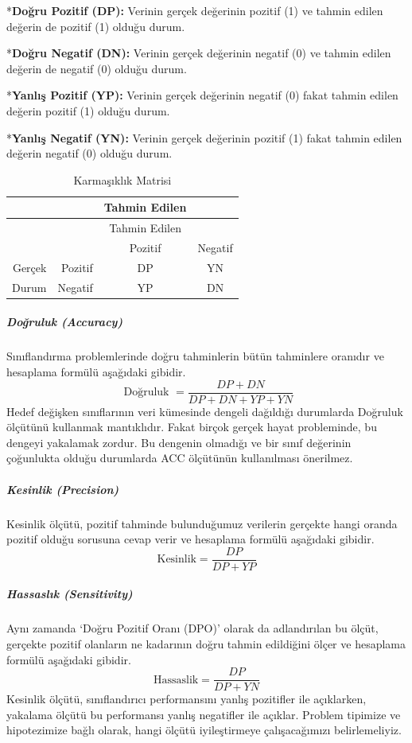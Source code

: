\documentclass[12pt,twoside]{deuthesis}
\begin{document}
*\textbf{Doğru Pozitif (DP):} Verinin gerçek değerinin pozitif (1) ve tahmin edilen değerin de pozitif (1) olduğu durum.

*\textbf{Doğru Negatif (DN):} Verinin gerçek değerinin negatif (0) ve tahmin edilen değerin de negatif (0) olduğu durum.

*\textbf{Yanlış Pozitif (YP):} Verinin gerçek değerinin negatif (0) fakat tahmin edilen değerin pozitif (1) olduğu durum.

*\textbf{Yanlış Negatif (YN):} Verinin gerçek değerinin pozitif (1) fakat tahmin edilen değerin negatif (0) olduğu durum.
\begin{longtable}[]{@{}rrcc@{}}
\caption{\label{tab:inher} Karmaşıklık Matrisi}\tabularnewline
\toprule
& & Tahmin Edilen &\tabularnewline
\midrule
\endfirsthead
\toprule
& & Tahmin Edilen &\tabularnewline
\midrule
\endhead
& & Pozitif & Negatif\tabularnewline
Gerçek & Pozitif & DP & YN\tabularnewline
Durum & Negatif & YP & DN\tabularnewline
\bottomrule
\end{longtable}
\hypertarget{doux11fruluk-accuracy}{%
\subparagraph{Doğruluk (Accuracy)}\label{doux11fruluk-accuracy}}

Sınıflandırma problemlerinde doğru tahminlerin bütün tahminlere oranıdır ve hesaplama formülü aşağıdaki gibidir.
\[
\text { Doğruluk }=\frac{D P+D N}{D P+D N+Y P+Y N}
\]
Hedef değişken sınıflarının veri kümesinde dengeli dağıldığı durumlarda Doğruluk ölçütünü kullanmak mantıklıdır. Fakat birçok gerçek hayat probleminde, bu dengeyi yakalamak zordur. Bu dengenin olmadığı ve bir sınıf değerinin çoğunlukta olduğu durumlarda ACC ölçütünün kullanılması önerilmez.

\hypertarget{kesinlik-precision}{%
\subparagraph{Kesinlik (Precision)}\label{kesinlik-precision}}

Kesinlik ölçütü, pozitif tahminde bulunduğumuz verilerin gerçekte hangi oranda pozitif olduğu sorusuna cevap verir ve hesaplama formülü aşağıdaki gibidir.
\[
\text {Kesinlik}=\frac{D P}{D P+Y P}
\]

\hypertarget{hassaslux131k-sensitivity}{%
\subparagraph{Hassaslık (Sensitivity)}\label{hassaslux131k-sensitivity}}

Aynı zamanda `Doğru Pozitif Oranı (DPO)' olarak da adlandırılan bu ölçüt, gerçekte pozitif olanların ne kadarının doğru tahmin edildiğini ölçer ve hesaplama formülü aşağıdaki gibidir.
\[
\text {Hassaslik}=\frac{D P}{D P+Y N}
\]
Kesinlik ölçütü, sınıflandırıcı performansını yanlış pozitifler ile açıklarken, yakalama ölçütü bu performansı yanlış negatifler ile açıklar. Problem tipimize ve hipotezimize bağlı olarak, hangi ölçütü iyileştirmeye çalışacağımızı belirlemeliyiz.
\end{document}
